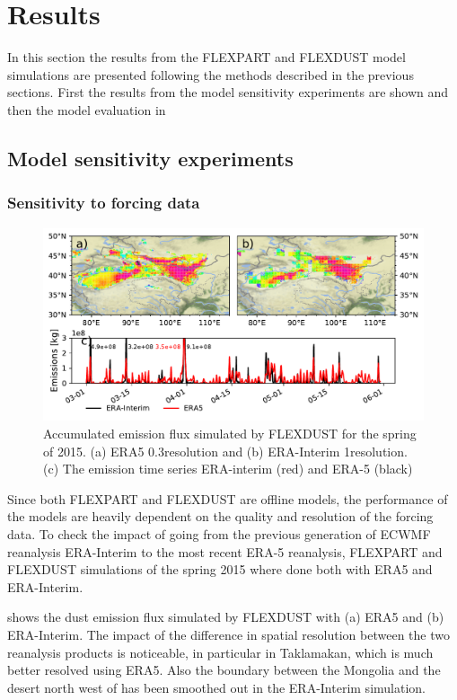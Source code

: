 \chapter{Results}
In this section the results from the FLEXPART and FLEXDUST model simulations are presented following the methods described in the previous sections. First the results from the model sensitivity experiments are shown  and then the model evaluation in 

\section{Model sensitivity experiments}\label{sec:sensitvity_experiment}
\subsection{Sensitivity to forcing data}

\begin{figure}[htpb]
    \centering
    \includegraphics[width=\textwidth]{texfiles/figs/emissions_ERA5_ERA-interim.pdf}
    \caption{Accumulated emission flux simulated by FLEXDUST for the spring of 2015. (a) ERA5 0.3\degree resolution and (b) ERA-Interim 1\degree resolution. (c) The emission time series ERA-interim (red) and ERA-5 (black) }
    \label{fig:ERA5_ERA-interim_emissions}
\end{figure}

Since both FLEXPART and FLEXDUST are offline models, the performance of the models 
are heavily dependent on the quality and resolution of the forcing data. To check the impact of going from the previous generation of ECWMF reanalysis ERA-Interim to the most recent ERA-5 reanalysis, FLEXPART and FLEXDUST simulations of the spring 2015 where done both with ERA5 and ERA-Interim. 

\par {} shows the dust emission flux simulated by FLEXDUST with (a) ERA5 and (b) ERA-Interim. The impact of the difference in spatial resolution between the two reanalysis products is noticeable, in particular in Taklamakan, which is much better resolved using ERA5. Also the boundary between the Mongolia and the desert north west of has been smoothed out in the ERA-Interim simulation.



